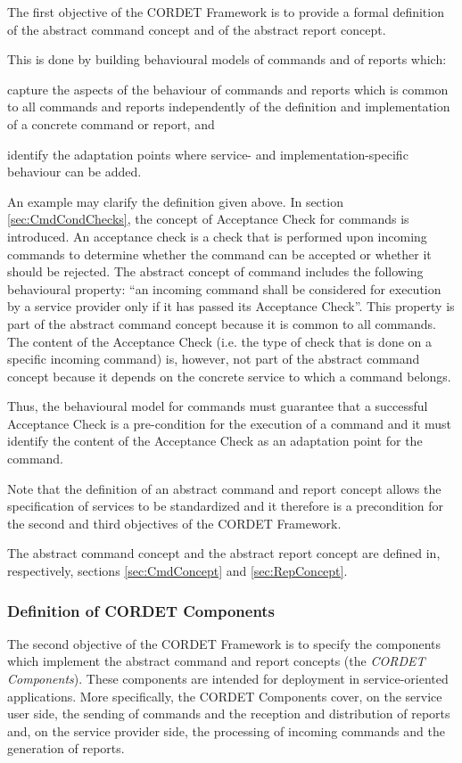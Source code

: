 \documentclass[a4paper,10pt]{article}
\newenvironment{fw_enumerate}					%
{\begin{enumerate}
  \setlength{\itemsep}{1mm}
  \setlength{\parskip}{0pt}
  \setlength{\parsep}{0pt}}
{\end{enumerate}}
\begin{document}
The first objective of the CORDET Framework is to provide a formal definition of the abstract command concept and of the abstract report concept. 

This is done by building behavioural models of commands and of reports which:

\begin{fw_enumerate}
\item{} capture the aspects of the behaviour of commands and reports which is common to all commands and reports independently of the definition and implementation of a concrete command or report, and
\item{} identify the adaptation points where service- and implementation-specific behaviour can be added.
\end{fw_enumerate}

An example may clarify the definition given above. 
In section \ref{sec:CmdCondChecks}, the concept of Acceptance Check for commands is introduced. 
An acceptance check is a check that is performed upon incoming commands to determine whether the command can be accepted or whether it should be rejected. 
The abstract concept of command includes the following behavioural property: “an incoming command shall be considered for execution by a service provider only if it has passed its Acceptance Check”. 
This property is part of the abstract command concept because it is common to all commands. 
The content of the Acceptance Check (i.e. the type of check that is done on a specific incoming command) is, however, not part of the abstract command concept because it depends on the concrete service to which a command belongs.

Thus, the behavioural model for commands must guarantee that a successful Acceptance Check is a pre-condition for the execution of a command and it must identify the content of the Acceptance Check as an adaptation point for the command.

Note that the definition of an abstract command and report concept allows the specification of services to be standardized and it therefore is a precondition for the second and third objectives of the CORDET Framework. 

The abstract command concept and the abstract report concept are defined in, respectively, sections \ref{sec:CmdConcept} and \ref{sec:RepConcept}.


\subsubsection{Definition of CORDET Components}\label{sec:DefCrCmp}
The second objective of the CORDET Framework is to specify the components which implement the abstract command and report concepts (the \textit{CORDET Components}). 
These components are intended for deployment in service-oriented applications. 
More specifically, the CORDET Components cover, on the service user side, the sending of commands and the reception and distribution of reports and, on the service provider side, the processing of incoming commands and the generation of reports.
\end{document}
